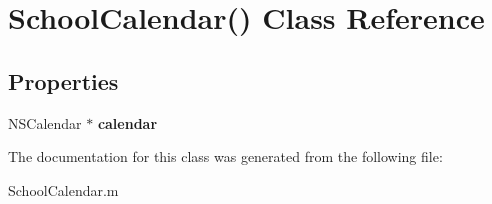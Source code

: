 \hypertarget{interface_school_calendar_07_08}{\section{\-School\-Calendar() \-Class \-Reference}
\label{interface_school_calendar_07_08}
}
\subsection*{\-Properties}
\begin{DoxyCompactItemize}
\item 
\hypertarget{interface_school_calendar_07_08_ab61efcf32e38c7d2b2de354dddb9a06a}{\-N\-S\-Calendar $\ast$ {\bfseries calendar}}\label{interface_school_calendar_07_08_ab61efcf32e38c7d2b2de354dddb9a06a}

\end{DoxyCompactItemize}


\-The documentation for this class was generated from the following file\-:\begin{DoxyCompactItemize}
\item 
\-School\-Calendar.\-m\end{DoxyCompactItemize}
